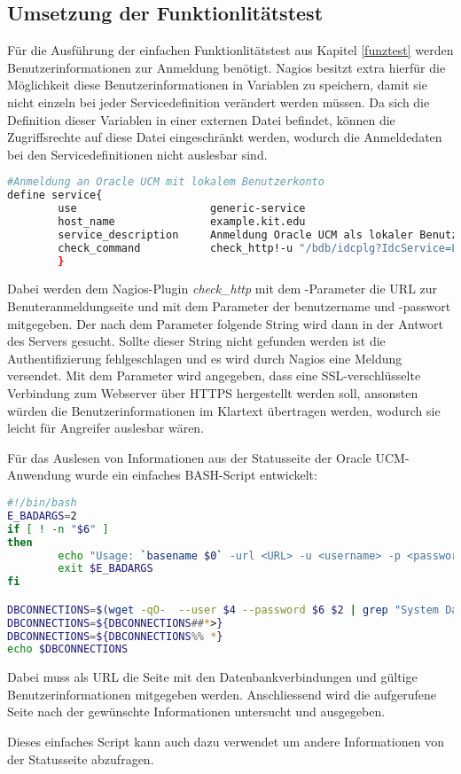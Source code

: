 \subsection{Umsetzung der Funktionlitätstest}

Für die Ausführung der einfachen Funktionlitätstest aus Kapitel \ref{funztest} werden Benutzerinformationen zur Anmeldung benötigt.
Nagios besitzt extra hierfür die Möglichkeit diese Benutzerinformationen in Variablen zu speichern, damit sie nicht einzeln bei jeder Servicedefinition verändert werden müssen.
Da sich die Definition dieser Variablen in einer externen Datei befindet, können die Zugriffsrechte auf diese Datei eingeschränkt werden, wodurch die Anmeldedaten bei den Servicedefinitionen nicht auslesbar sind.

\begin{lstlisting}[captionpos=b, caption=Funktionalitätstest der Benutzeranmeldung, label=userauthdef, breaklines = true, language=sh]
#Anmeldung an Oracle UCM mit lokalem Benutzerkonto
define service{
        use                     generic-service
        host_name               example.kit.edu
        service_description     Anmeldung Oracle UCM als lokaler Benutzer
        check_command           check_http!-u "/bdb/idcplg?IdcService=LOGIN&Action=GetTemplatePage&Page=HOME\_PAGE&Auth=Internet"  -a $USER3$:$USER4$ -e "Sie sind angemeldet als" -S
        }
\end{lstlisting}


Dabei werden dem Nagios-Plugin \textit{check\_http} mit dem -Parameter die URL zur Benuteranmeldungseite und mit dem Parameter  der benutzername und -passwort mitgegeben.
Der nach dem Parameter  folgende String wird dann in der Antwort des Servers gesucht.
Sollte dieser String nicht gefunden werden ist die Authentifizierung fehlgeschlagen und es wird durch Nagios eine Meldung versendet.
Mit dem Parameter  wird angegeben, dass eine \gls{SSL}-verschlüsselte Verbindung zum Webserver über HTTPS hergestellt werden soll, ansonsten würden die Benutzerinformationen im Klartext übertragen werden, wodurch sie leicht für Angreifer auslesbar wären.

Für das Auslesen von Informationen aus der Statusseite der Oracle UCM-Anwendung wurde ein einfaches BASH-Script entwickelt:

\begin{lstlisting}[captionpos=b, caption=Auslesen der Verbindungen zur Datenbank, label=dbcon, breaklines = true, language=sh]
#!/bin/bash
E_BADARGS=2
if [ ! -n "$6" ]
then
        echo "Usage: `basename $0` -url <URL> -u <username> -p <password>"
        exit $E_BADARGS
fi

DBCONNECTIONS=$(wget -qO-  --user $4 --password $6 $2 | grep "System Database")
DBCONNECTIONS=${DBCONNECTIONS##*>}
DBCONNECTIONS=${DBCONNECTIONS%% *}
echo $DBCONNECTIONS
\end{lstlisting}

Dabei muss als URL die Seite mit den Datenbankverbindungen und gültige Benutzerinformationen mitgegeben werden.
Anschliessend wird die aufgerufene Seite nach der gewünschte Informationen untersucht und ausgegeben.

Dieses einfaches Script kann auch dazu verwendet um andere Informationen von der Statusseite abzufragen.